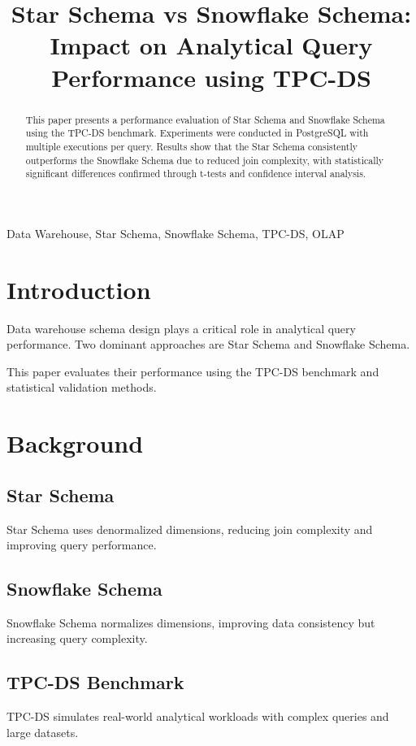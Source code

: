 \documentclass[conference]{IEEEtran}
\title{Star Schema vs Snowflake Schema: Impact on Analytical Query Performance using TPC-DS}
\author{
\IEEEauthorblockN{Seu Nome}
\IEEEauthorblockA{
Universidade / Instituição \\
Email: seu@email.com
}
}
\begin{document}
\maketitle

\begin{abstract}
This paper presents a performance evaluation of Star Schema and Snowflake Schema using the TPC-DS benchmark. Experiments were conducted in PostgreSQL with multiple executions per query. Results show that the Star Schema consistently outperforms the Snowflake Schema due to reduced join complexity, with statistically significant differences confirmed through t-tests and confidence interval analysis.
\end{abstract}

\begin{IEEEkeywords}
Data Warehouse, Star Schema, Snowflake Schema, TPC-DS, OLAP
\end{IEEEkeywords}

\section{Introduction}

Data warehouse schema design plays a critical role in analytical query performance. Two dominant approaches are Star Schema and Snowflake Schema.

This paper evaluates their performance using the TPC-DS benchmark and statistical validation methods.

\section{Background}

\subsection{Star Schema}
Star Schema uses denormalized dimensions, reducing join complexity and improving query performance.

\subsection{Snowflake Schema}
Snowflake Schema normalizes dimensions, improving data consistency but increasing query complexity.

\subsection{TPC-DS Benchmark}
TPC-DS simulates real-world analytical workloads with complex queries and large datasets.
\end{document}
